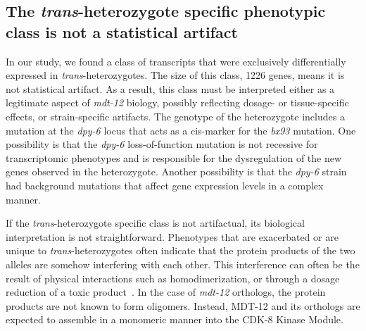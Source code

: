 \documentclass[10pt, twocolumn]{article}
\newcommand{\cel}{\emph{C.~elegans}}
\newcommand{\gene}[1]{\mbox{\emph{#1}}}
\newcommand{\protein}[1]{\mbox{\uppercase{#1}}}
\newcommand{\dpy}{\gene{mdt-12}}
\begin{document}

\subsection*{The \emph{trans}-heterozygote specific phenotypic class is not a
             statistical artifact}
In our study, we found a class of transcripts that were exclusively
differentially expressed in \emph{trans}-heterozygotes. The size of this class,
1226 genes, means it is not statistical artifact. As a result, this class
must be interpreted either as a legitimate aspect of \dpy{} biology, possibly
reflecting dosage- or tissue-specific effects, or strain-specific artifacts.
The genotype of the heterozygote includes a mutation at the \gene{dpy-6} locus
that acts as a cis-marker for the \emph{bx93} mutation. One possibility is that
the \emph{dpy-6} loss-of-function mutation is not recessive for transcriptomic
phenotypes and is responsible for the dysregulation of the new genes observed in
the heterozygote. Another possibility is that the \emph{dpy-6} strain had
background mutations that affect gene expression levels in a complex manner.

If the \emph{trans}-heterozygote specific class is not artifactual, its
biological interpretation is not straightforward. Phenotypes that are
exacerbated or are unique to \emph{trans}-heterozygotes often indicate that the
protein products of the two alleles are somehow interfering with each other.
This interference can often be the result of physical interactions such as
homodimerization, or through a dosage reduction of a toxic
product~\cite{Yook2005}. In the case of \dpy{} orthologs, the protein products
are not known to form oligomers. Instead, \protein{mdt-12} and its orthologs are
expected to assemble in a monomeric manner into the \protein{cdk-8} Kinase
Module.
\end{document}
